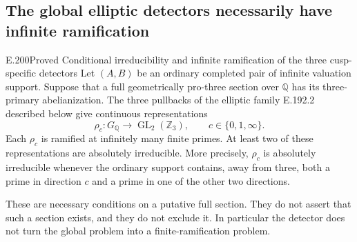 \subsection{The global elliptic detectors necessarily have infinite ramification}

\begin{result}{E.200}{Proved}
{Conditional irreducibility and infinite ramification of the three cusp-specific detectors}
Let \((A,B)\) be an ordinary completed pair of infinite valuation
support.  Suppose that a full geometrically pro-three section over
\(\mathbb Q\) has its three-primary abelianization.  The three
pullbacks of the elliptic family E.192.2 described below give continuous
representations
\[
             \rho_c:G_{\mathbb Q}\longrightarrow
                         \operatorname{GL}_2(\mathbb Z_3),
             \qquad c\in\{0,1,\infty\}.
\tag{E.200.1}
\]
Each \(\rho_c\) is ramified at infinitely many finite primes.
At least two of these representations are absolutely irreducible.
More precisely, \(\rho_c\) is absolutely irreducible whenever the
ordinary support contains, away from three, both a prime in direction
\(c\) and a prime in one of the other two directions.

These are necessary conditions on a putative full section.  They do
not assert that such a section exists, and they do not exclude it.
In particular the detector does not turn the global problem into a
finite-ramification problem.
\end{result}

